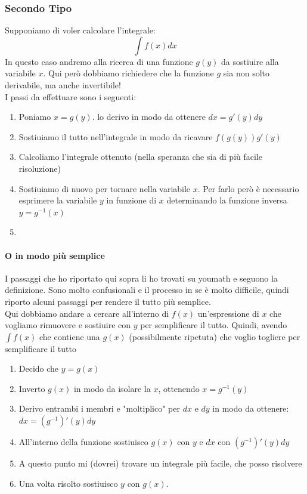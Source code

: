 \documentclass[12pt, a4paper, openany]{book}
\begin{document}
	\subsubsection*{Secondo Tipo}
	Supponiamo di voler calcolare l'integrale: $$\int f(x)dx$$
	In questo caso andremo alla ricerca di una funzione $g(y)$ da sostiuire alla variabile $x$.
	Qui però dobbiamo richiedere che la funzione $g$ sia non solto derivabile, ma anche invertibile!
	\\I passi da effettuare sono i seguenti:
	\begin{enumerate}
		\item Poniamo $x=g(y)$. lo derivo in modo da ottenere $dx=g'(y)dy$
		\item Sostiuiamo il tutto nell'integrale in modo da ricavare $f(g(y))g'(y)$
		\item Calcoliamo l'integrale ottenuto (nella speranza che sia di più facile risoluzione)
		\item Sostiuiamo di nuovo per tornare nella variabile $x$. Per farlo però è necessario esprimere la variabile $y$ in funzione di $x$ determinando la funzione inversa $y=g^{-1}(x)$
		\item 
	\end{enumerate}

	\paragraph*{O in modo più semplice}
	I passaggi che ho riportato qui sopra li ho trovati su youmath e seguono la definizione.
	Sono molto confusionali e il processo in se è molto difficile, quindi riporto alcuni passaggi per rendere il tutto più semplice.
	\\Qui dobbiamo andare a cercare all'interno di $f(x)$ un'espressione di $x$ che vogliamo rimuovere e sostiuire con $y$ per semplificare il tutto.
	Quindi, avendo $\int f(x)$ che contiene una $g(x)$ (possibilmente ripetuta) che voglio togliere per semplificare il tutto
	\begin{enumerate}
		\item Decido che $y=g(x)$
		\item Inverto $g(x)$ in modo da isolare la $x$, ottenendo $x=g^{-1}(y)$
		\item Derivo entrambi i membri e "moltiplico" per $dx$ e $dy$ in modo da ottenere: $dx=(g^{-1})'(y)dy$
		\item All'interno della funzione sostiuisco $g(x)$ con $y$ e $dx$ con $(g^{-1})'(y)dy$
		\item A questo punto mi (dovrei) trovare un integrale più facile, che posso risolvere
		\item Una volta risolto sostiuisco $y$ con $g(x)$.
	\end{enumerate}
\end{document}

